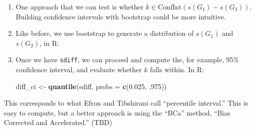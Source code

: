 \documentclass[]{book}
\newenvironment{Shaded}{\begin{snugshade}}{\end{snugshade}}
\newcommand{\CommentTok}[1]{\textcolor[rgb]{0.56,0.35,0.01}{\textit{#1}}}
\newcommand{\ControlFlowTok}[1]{\textcolor[rgb]{0.13,0.29,0.53}{\textbf{#1}}}
\newcommand{\DataTypeTok}[1]{\textcolor[rgb]{0.13,0.29,0.53}{#1}}
\newcommand{\DecValTok}[1]{\textcolor[rgb]{0.00,0.00,0.81}{#1}}
\newcommand{\FloatTok}[1]{\textcolor[rgb]{0.00,0.00,0.81}{#1}}
\newcommand{\KeywordTok}[1]{\textcolor[rgb]{0.13,0.29,0.53}{\textbf{#1}}}
\newcommand{\NormalTok}[1]{#1}
\newcommand{\OperatorTok}[1]{\textcolor[rgb]{0.81,0.36,0.00}{\textbf{#1}}}
\newcommand{\StringTok}[1]{\textcolor[rgb]{0.31,0.60,0.02}{#1}}
\begin{document}
\begin{enumerate}
\def\labelenumi{\arabic{enumi}.}
\item
  One approach that we can test is whether \(k \in \mbox{ConfInt}(s(G_1) - s(G_2))\).
  Building confidence intervals with bootstrap could be more intuitive.
\item
  Like before, we use bootstrap to generate a distribution of \(s(G_1)\) and
  \(s(G_2)\), in R:

\begin{Shaded}
\end{Shaded}
\item
  Once we have \texttt{sdiff}, we can proceed and compute the, for example, 95\%
  confidence interval, and evaluate whether \(k\) falls within. In R:

\begin{Shaded}
\begin{Highlighting}[]
\NormalTok{diff_ci <-}\StringTok{ }\KeywordTok{quantile}\NormalTok{(sdiff, }\DataTypeTok{probs =} \KeywordTok{c}\NormalTok{(}\FloatTok{0.025}\NormalTok{, }\FloatTok{.975}\NormalTok{))}
\end{Highlighting}
\end{Shaded}
\end{enumerate}

This corresponds to what Efron and Tibshirani call ``percentile interval.''
This is easy to compute, but a better approach is using the ``BCa'' method,
``Bias Corrected and Accelerated.'' (TBD)
\end{document}
